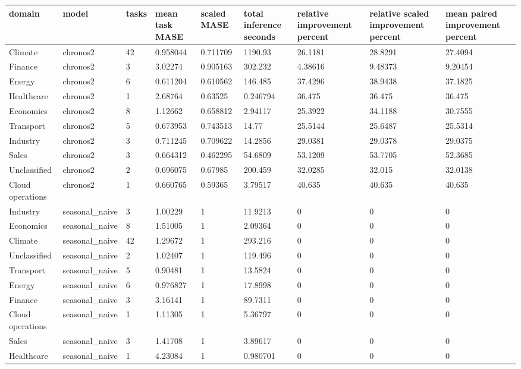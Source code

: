 \begin{tabular}{lllllllll}
\toprule
domain & model & tasks & mean task MASE & scaled MASE & total inference seconds & relative improvement percent & relative scaled improvement percent & mean paired improvement percent \\
\midrule
Climate & chronos2 & 42 & 0.958044 & 0.711709 & 1190.93 & 26.1181 & 28.8291 & 27.4094 \\
Finance & chronos2 & 3 & 3.02274 & 0.905163 & 302.232 & 4.38616 & 9.48373 & 9.20454 \\
Energy & chronos2 & 6 & 0.611204 & 0.610562 & 146.485 & 37.4296 & 38.9438 & 37.1825 \\
Healthcare & chronos2 & 1 & 2.68764 & 0.63525 & 0.246794 & 36.475 & 36.475 & 36.475 \\
Economics & chronos2 & 8 & 1.12662 & 0.658812 & 2.94117 & 25.3922 & 34.1188 & 30.7555 \\
Transport & chronos2 & 5 & 0.673953 & 0.743513 & 14.77 & 25.5144 & 25.6487 & 25.5314 \\
Industry & chronos2 & 3 & 0.711245 & 0.709622 & 14.2856 & 29.0381 & 29.0378 & 29.0375 \\
Sales & chronos2 & 3 & 0.664312 & 0.462295 & 54.6809 & 53.1209 & 53.7705 & 52.3685 \\
Unclassified & chronos2 & 2 & 0.696075 & 0.67985 & 200.459 & 32.0285 & 32.015 & 32.0138 \\
Cloud operations & chronos2 & 1 & 0.660765 & 0.59365 & 3.79517 & 40.635 & 40.635 & 40.635 \\
Industry & seasonal\_naive & 3 & 1.00229 & 1 & 11.9213 & 0 & 0 & 0 \\
Economics & seasonal\_naive & 8 & 1.51005 & 1 & 2.09364 & 0 & 0 & 0 \\
Climate & seasonal\_naive & 42 & 1.29672 & 1 & 293.216 & 0 & 0 & 0 \\
Unclassified & seasonal\_naive & 2 & 1.02407 & 1 & 119.496 & 0 & 0 & 0 \\
Transport & seasonal\_naive & 5 & 0.90481 & 1 & 13.5824 & 0 & 0 & 0 \\
Energy & seasonal\_naive & 6 & 0.976827 & 1 & 17.8998 & 0 & 0 & 0 \\
Finance & seasonal\_naive & 3 & 3.16141 & 1 & 89.7311 & 0 & 0 & 0 \\
Cloud operations & seasonal\_naive & 1 & 1.11305 & 1 & 5.36797 & 0 & 0 & 0 \\
Sales & seasonal\_naive & 3 & 1.41708 & 1 & 3.89617 & 0 & 0 & 0 \\
Healthcare & seasonal\_naive & 1 & 4.23084 & 1 & 0.980701 & 0 & 0 & 0 \\
\bottomrule
\end{tabular}
